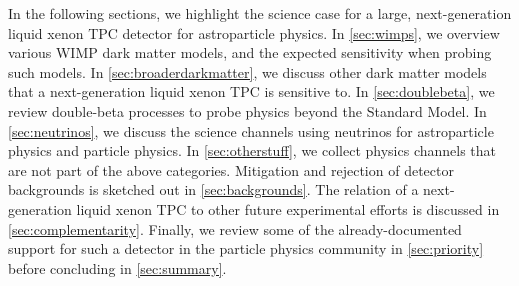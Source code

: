 In the following sections, we highlight the science case for a large, next-generation liquid xenon TPC detector for astroparticle physics. In \autoref{sec:wimps}, we overview various WIMP dark matter models, and the expected sensitivity when probing such models. In \autoref{sec:broaderdarkmatter}, we discuss other dark matter models that a next-generation liquid xenon TPC is sensitive to. In \autoref{sec:doublebeta}, we review double-beta processes to probe physics beyond the Standard Model. In \autoref{sec:neutrinos}, we discuss the science channels using neutrinos for astroparticle physics and particle physics. In \autoref{sec:otherstuff}, we collect physics channels that are not part of the above categories. Mitigation and rejection of detector backgrounds is sketched out in \autoref{sec:backgrounds}. The relation of a next-generation liquid xenon TPC to other future experimental efforts is discussed in \autoref{sec:complementarity}. Finally, we review some of the already-documented support for such a detector in the particle physics community in \autoref{sec:priority} before concluding in \autoref{sec:summary}. 
